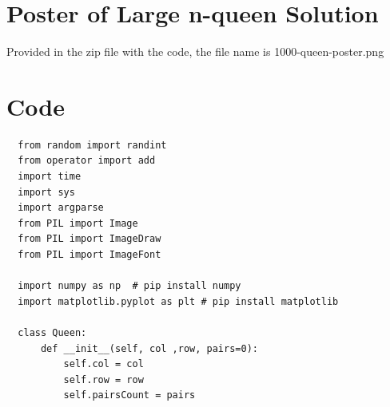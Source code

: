\documentclass{article}
\begin{document}
\section{Poster of Large n-queen Solution}
Provided in the zip file with the code, the file name is 1000-queen-poster.png
\section{Code}
\begin{verbatim}
  from random import randint
  from operator import add
  import time
  import sys
  import argparse
  from PIL import Image
  from PIL import ImageDraw
  from PIL import ImageFont
  
  import numpy as np  # pip install numpy
  import matplotlib.pyplot as plt # pip install matplotlib
  
  class Queen: 
      def __init__(self, col ,row, pairs=0): 
          self.col = col 
          self.row = row
          self.pairsCount = pairs
    \end{verbatim}
\newpage
\end{document}
